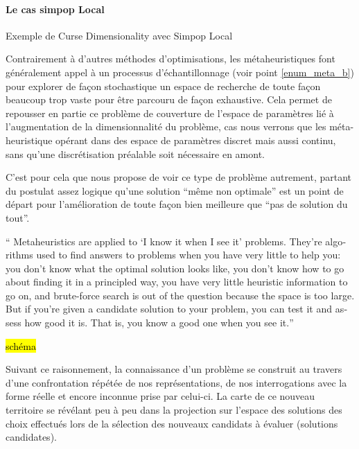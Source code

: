 \paragraph{Le cas simpop Local}
\begin{framewithtitle}[bla]{Exemple de Curse Dimensionality avec Simpop Local}


\end{framewithtitle}






Contrairement à d'autres méthodes d'optimisations, les métaheuristiques font généralement appel à un processus d'échantillonnage (voir point \ref{enum_meta_b}) pour explorer de façon stochastique un espace de recherche de toute façon beaucoup trop vaste pour être parcouru de façon exhaustive. Cela permet de repousser en partie ce problème de couverture de l'espace de paramètres lié à l'augmentation de la dimensionnalité du problème, cas nous verrons que les méta-heuristique opérant dans des espace de paramètres discret mais aussi continu, sans qu'une discrétisation préalable soit nécessaire en amont.

C'est pour cela que \textcite[7]{Luke2013} nous propose de voir ce type de problème autrement, partant du postulat assez logique qu'une solution \enquote{même non optimale} est un point de départ pour l'amélioration de toute façon bien meilleure que \enquote{pas de solution du tout}.

\foreignquote{english}{ Metaheuristics are applied to \enquote{I know it when I see it} problems. They're algorithms used to find answers to problems when you have very little to help you: you don't know what the optimal solution looks like, you don't know how to go about finding it in a principled way, you have very little heuristic information to go on, and brute-force search is out of the question because the space is too large. But if you're given a candidate solution to your problem, you can test it and assess how good it is. That is, you know a good one when you see it.}

\hl{schéma}

Suivant ce raisonnement, la connaissance d'un problème se construit au travers d'une confrontation répétée de nos représentations, de nos interrogations avec la forme réelle et encore inconnue prise par celui-ci. La carte de ce nouveau territoire se révélant peu à peu dans la projection sur l'espace des solutions des choix effectués lors de la sélection des nouveaux candidats à évaluer (solutions candidates).

